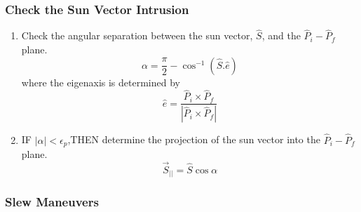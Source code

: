 \documentclass[letterpaper, preprint, paper,11pt]{AAS}	%
\begin{document}
		\subsubsection{Check the Sun Vector Intrusion}
			\begin{enumerate}
				\item Check the angular separation between the sun vector, $\hat{S}$, and the $\hat{P}_i-\hat{P}_f$ plane.
				\begin{equation}
				\alpha=\frac{\pi}{2}-\cos^{-1}(\hat{S}.\hat{e})
				\end{equation}
				where the eigenaxis is determined by
				\begin{equation}\label{eaxis}
				\hat{e}=\frac{\hat{P}_i\times\hat{P}_f}{|\hat{P}_i\times \hat{P}_f|}
				\end{equation} 
				
				\item IF $|\alpha|<\epsilon_p$,THEN determine the projection of the sun vector into the $\hat{P}_i-\hat{P}_f$ plane.
				\begin{equation}\label{Sbar}
				\vec{S}_{||}=\hat{S}\cos\alpha
				\end{equation}
			\end{enumerate}
		
		
		\subsubsection{Slew Maneuvers}
		
\end{document}
